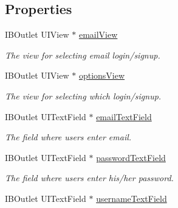 \subsection*{Properties}
\begin{DoxyCompactItemize}
\item 
\hypertarget{interface_login_sign_up_a797d5135d8e0f5c3764e6c8e863628e8}{I\+B\+Outlet U\+I\+View $\ast$ \hyperlink{interface_login_sign_up_a797d5135d8e0f5c3764e6c8e863628e8}{email\+View}}\label{interface_login_sign_up_a797d5135d8e0f5c3764e6c8e863628e8}

\begin{DoxyCompactList}\small\item\em The view for selecting email login/signup. \end{DoxyCompactList}\item 
\hypertarget{interface_login_sign_up_a9e3a9ddb0ec8c4770478e8e96691aa70}{I\+B\+Outlet U\+I\+View $\ast$ \hyperlink{interface_login_sign_up_a9e3a9ddb0ec8c4770478e8e96691aa70}{options\+View}}\label{interface_login_sign_up_a9e3a9ddb0ec8c4770478e8e96691aa70}

\begin{DoxyCompactList}\small\item\em The view for selecting which login/signup. \end{DoxyCompactList}\item 
\hypertarget{interface_login_sign_up_aef2c833e97693b442b9bf988f7809826}{I\+B\+Outlet U\+I\+Text\+Field $\ast$ \hyperlink{interface_login_sign_up_aef2c833e97693b442b9bf988f7809826}{email\+Text\+Field}}\label{interface_login_sign_up_aef2c833e97693b442b9bf988f7809826}

\begin{DoxyCompactList}\small\item\em The field where users enter email. \end{DoxyCompactList}\item 
\hypertarget{interface_login_sign_up_aad42d499881b619e94e5bbab8b20ce40}{I\+B\+Outlet U\+I\+Text\+Field $\ast$ \hyperlink{interface_login_sign_up_aad42d499881b619e94e5bbab8b20ce40}{password\+Text\+Field}}\label{interface_login_sign_up_aad42d499881b619e94e5bbab8b20ce40}

\begin{DoxyCompactList}\small\item\em The field where users enter his/her password. \end{DoxyCompactList}\item 
\hypertarget{interface_login_sign_up_abee440735a89803ee5a32787941dafe6}{I\+B\+Outlet U\+I\+Text\+Field $\ast$ \hyperlink{interface_login_sign_up_abee440735a89803ee5a32787941dafe6}{username\+Text\+Field}}\label{interface_login_sign_up_abee440735a89803ee5a32787941dafe6}


\end{DoxyCompactItemize}
